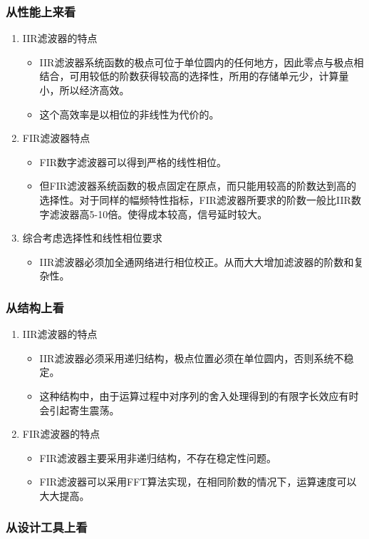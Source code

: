 \documentclass[notheorems,compress,mathserif,table]{beamer}
\begin{document}
\begin{frame}\frametitle{从性能上来看}%
\begin{enumerate}
  \item IIR滤波器的特点
            \begin{itemize}
              \item IIR滤波器系统函数的极点可位于单位圆内的任何地方，因此零点与极点相结合，可用较低的阶数获得较高的选择性，所用的存储单元少，计算量小，所以经济高效。
              \item 这个高效率是以相位的非线性为代价的。
            \end{itemize}
  \item FIR滤波器特点
            \begin{itemize}
              \item FIR数字滤波器可以得到严格的线性相位。
              \item 但FIR滤波器系统函数的极点固定在原点，而只能用较高的阶数达到高的选择性。对于同样的幅频特性指标，FIR滤波器所要求的阶数一般比IIR数字滤波器高5-10倍。使得成本较高，信号延时较大。
            \end{itemize}
  \item 综合考虑选择性和线性相位要求
            \begin{itemize}
              \item IIR滤波器必须加全通网络进行相位校正。从而大大增加滤波器的阶数和复杂性。
            \end{itemize}
  \end{enumerate}

\end{frame}


\begin{frame}\frametitle{从结构上看}%
\begin{enumerate}
  \item IIR滤波器的特点
      \begin{itemize}
        \item IIR滤波器必须采用递归结构，极点位置必须在单位圆内，否则系统不稳定。
        \item 这种结构中，由于运算过程中对序列的舍入处理得到的有限字长效应有时会引起寄生震荡。
      \end{itemize}
  \item FIR滤波器的特点
      \begin{itemize}
        \item FIR滤波器主要采用非递归结构，不存在稳定性问题。
        \item FIR滤波器可以采用FFT算法实现，在相同阶数的情况下，运算速度可以大大提高。
      \end{itemize}
\end{enumerate}
\end{frame}


\begin{frame}\frametitle{从设计工具上看}%

\end{frame}
\end{document}
